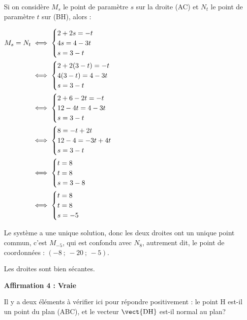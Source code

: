 Si on considère $M_s$ le point de paramètre $s$ sur la droite (AC) et $N_t$ le point de paramètre $t$ sur (BH), alors :

$\aligned M_s = N_t &\iff \begin{cases} 2+2s =  - t\\4s = 4 - 3t\\s=3 - t\end{cases}\\
&\iff \begin{cases} 2+2(3-t) =  - t\\4(3-t) = 4 - 3t\\s=3 - t\end{cases}\\
&\iff \begin{cases} 2+6-2t =  - t\\12-4t = 4 - 3t\\s=3 - t\end{cases}\\
&\iff \begin{cases} 8 =  -t+2t\\12-4 =  - 3t+4t\\s=3 - t\end{cases}\\
&\iff \begin{cases} t=8\\t=8\\s=3 - 8\end{cases}\\
&\iff \begin{cases} t=8\\t=8\\s=-5\end{cases}\\
\endaligned$

Le système a une unique solution, donc les deux droites ont un unique point commun, c'est $M_{-5}$, qui est confondu avec $N_8$, autrement dit, le point de coordonnées : $(-8~;~ -20~;~-5)$.

Les droites sont bien sécantes.
\medskip



\textbf{Affirmation 4 : Vraie}

Il y a deux éléments à vérifier ici pour répondre positivement : le point H est-il un point du plan (ABC), et le vecteur $\vect{\mathrm{DH}}$ est-il normal au plan?

